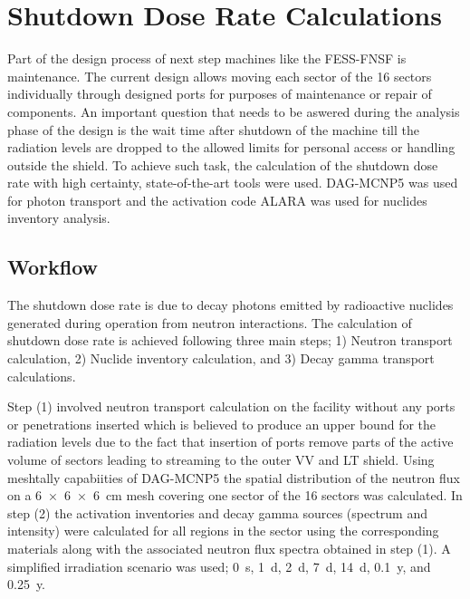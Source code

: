 \documentclass[12pt, letterpaper]{elsarticle}
\begin{document}
\section{Shutdown Dose Rate Calculations} \label{Shutdown Dose Rate Calculations}
Part of the design process of next step machines like the FESS-FNSF is maintenance. The current design allows moving each sector of the 16 sectors individually through designed ports for purposes of maintenance or repair of components. An important question that needs to be aswered during the analysis phase of the design is the wait time after shutdown of the machine till the radiation levels are dropped to the allowed limits for personal access or handling outside the shield. To achieve such task, the calculation of the shutdown dose rate with high certainty, state-of-the-art tools were used. DAG-MCNP5 was used for photon transport and the activation code ALARA was used for nuclides inventory analysis.\vspace{5mm}   

\subsection{Workflow} \label{SDR_workflow}
The shutdown dose rate is due to decay photons emitted by radioactive nuclides generated during operation from neutron interactions. The calculation of shutdown dose rate is achieved following three main steps; 1) Neutron transport calculation, 2) Nuclide inventory calculation, and 3) Decay gamma transport calculations.\vspace{5mm}

Step (1) involved neutron transport calculation on the facility without any ports or penetrations inserted which is believed to produce an upper bound for the radiation levels due to the fact that insertion of ports remove parts of the active volume of sectors leading to streaming to the outer VV and LT shield. Using meshtally capabiities of DAG-MCNP5 the spatial distribution of the neutron flux on a \SI{6x6x6}{cm} mesh covering one sector of the 16 sectors was calculated. In step (2) the activation inventories and decay gamma sources (spectrum and intensity) were calculated for all regions in the sector using the corresponding materials along with the associated neutron flux spectra obtained in step (1). A simplified irradiation scenario was used; \SI{0}{s}, \SI{1}{d}, \SI{2}{d}, \SI{7}{d}, \SI{14}{d}, \SI{0.1}{y}, and \SI{0.25}{y}.\vspace{5mm}
\end{document}
